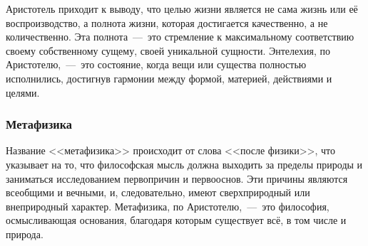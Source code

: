 
Аристотель приходит к выводу, что целью жизни является не сама жизнь или её воспроизводство, а полнота жизни, которая достигается качественно, а не количественно. Эта полнота~---~это стремление к максимальному соответствию своему собственному сущему, своей уникальной сущности. Энтелехия, по Аристотелю,~---~это состояние, когда вещи или существа полностью исполнились, достигнув гармонии между формой, материей, действиями и целями.

\subsubsection{Метафизика}

Название <<метафизика>> происходит от слова <<после физики>>, что указывает на то, что философская мысль должна выходить за пределы природы и заниматься исследованием первопричин и первооснов. Эти причины являются всеобщими и вечными, и, следовательно, имеют сверхприродный или внеприродный характер. Метафизика, по Аристотелю,~---~это философия, осмысливающая основания, благодаря которым существует всё, в том числе и природа.

